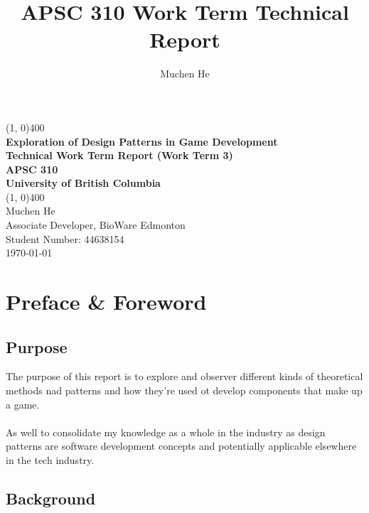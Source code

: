 \documentclass[10pt,letterpaper]{article}
\author{Muchen He}
\title{APSC 310 Work Term Technical Report}
\newcommand{\titletext}{Exploration of Design Patterns in Game Development}
\begin{document}
\begin{titlepage}
	\begin{center}
		\vspace*{3in}
		\line(1, 0){400}\\
		\Huge{\textbf{\titletext{}}}\\[0.2cm]
		\large{\textbf{Technical Work Term Report (Work Term 3)}}\\[1cm]
		\Large{\textbf{APSC 310}}\\
		\textbf{University of British Columbia}\\
		\line(1, 0){400}\\
		\vfill
		\Large{Muchen He}\\
		\large{Associate Developer, BioWare Edmonton}\\
		Student Number: 44638154\\

		\today \\
	\end{center}
\end{titlepage}

\setcounter{secnumdepth}{3}
\tableofcontents
\thispagestyle{empty}
\clearpage



\section*{Preface \& Foreword}

\subsection*{Purpose}

The purpose of this report is to explore and observer different kinds of theoretical methods nad patterns and how they're used ot develop components that make up a game.\\
\\
As well to consolidate my knowledge as a whole in the industry as design patterns are software development concepts and potentially applicable elsewhere in the tech industry.

\subsection*{Background}
\end{document}
